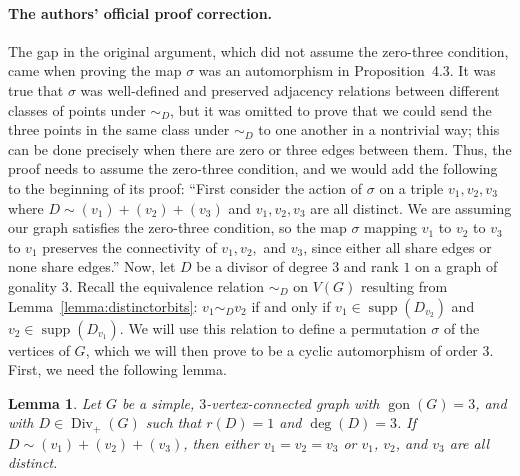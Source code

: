 \documentclass[10pt]{amsart}
\newtheorem{lemma}[theorem]{Lemma}
\DeclareMathOperator{\gon}{gon}
\DeclareMathOperator{\Div}{Div}
\DeclareMathOperator{\supp}{supp}
\begin{document}
\paragraph{The authors' official proof correction.}
The gap in the original argument, which did not assume the zero-three condition, came when proving the map $\sigma$ was an automorphism in Proposition~4.3. It was true that $\sigma$ was well-defined and preserved adjacency relations between different classes of points under $\sim_D$, but it was omitted to prove that we could send the three points in the same class under $\sim_D$ to one another in a nontrivial way; this can be done precisely when there are zero or three edges between them. Thus, the proof needs to assume the zero-three condition, and we would add the following to the beginning of its proof: ``First consider the action of $\sigma$ on a triple $v_1,v_2,v_3$ where $D\sim(v_1)+(v_2)+(v_3)$ and $v_1,v_2,v_3$ are all distinct. We are assuming our graph satisfies the zero-three condition, so the map $\sigma$ mapping $v_1$ to $v_2$ to $v_3$ to $v_1$ preserves the connectivity of $v_1,v_2,$ and $v_3$, since either all share edges or none share edges.''
Now, let $D$ be a divisor of degree 3 and rank $1$ on a graph of gonality $3$. Recall the equivalence relation $\sim_D$ on $V(G)$ resulting from Lemma~\ref{lemma:distinctorbits}: $v_1 \sim_D v_2$ if and only if $v_1 \in \supp (D_{v_2})$ and $v_2 \in \supp (D_{v_1})$. We will use this relation to define a permutation $\sigma$ of the vertices of $G$, which we will then prove to be a cyclic automorphism of order $3$. First, we need the following lemma.

\begin{lemma}
\label{lemma:1or3} Let $G$ be a simple, $3$-vertex-connected graph  with $\gon (G) = 3$, and with $D \in \Div _+(G)$ such that $r(D) = 1$ and $\deg (D) = 3$.
If $D\sim (v_1)+(v_2)+(v_3)$, then either $v_1=v_2=v_3$ or $v_1$, $v_2$, and $v_3$ are all distinct.
\end{lemma}
\end{document}
